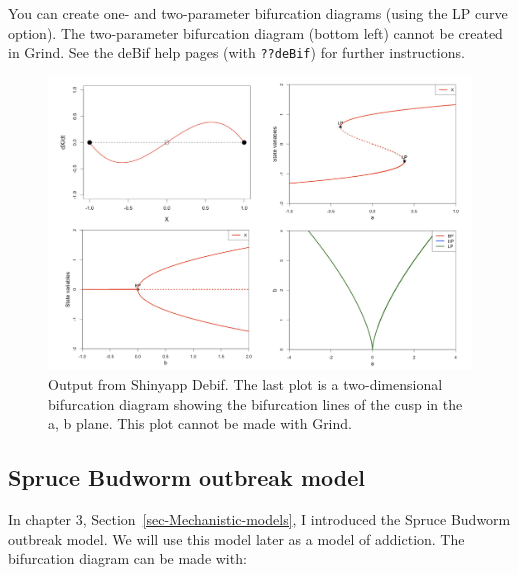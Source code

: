 \documentclass[
  a4paper,
  DIV=11,
  numbers=noendperiod]{scrreprt}
\begin{document}
You can create one- and two-parameter bifurcation diagrams (using the LP
curve option). The two-parameter bifurcation diagram (bottom left)
cannot be created in Grind. See the deBif help pages (with
\texttt{??deBif}) for further instructions.

\begin{figure}

{\centering \includegraphics{media/ch4n/image4.jpg}

}

\caption{\label{fig-ch4n-img4-old-52}Output from Shinyapp Debif. The
last plot is a two-dimensional bifurcation diagram showing the
bifurcation lines of the cusp in the a, b plane. This plot cannot be
made with Grind.}

\end{figure}

\hypertarget{sec-Spruce-Budworm-outbreak-model}{%
\subsection{Spruce Budworm outbreak
model}\label{sec-Spruce-Budworm-outbreak-model}}

In chapter 3, Section~\ref{sec-Mechanistic-models}, I introduced the
Spruce Budworm outbreak model. We will use this model later as a model
of addiction. The bifurcation diagram can be made with:
\end{document}

